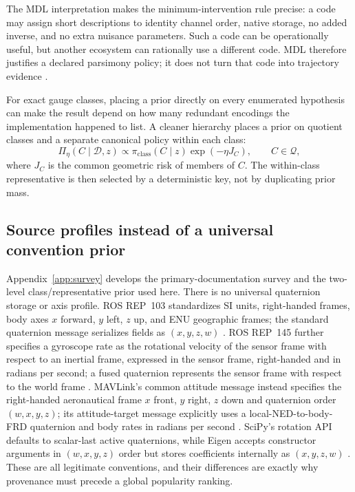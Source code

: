 \documentclass[11pt]{article}
\begin{document}
    The MDL interpretation makes the minimum-intervention rule precise: a code may assign
    short descriptions to identity channel order, native storage, no added inverse, and no
    extra nuisance parameters. Such a code can be operationally useful, but another
    ecosystem can rationally use a different code. MDL therefore justifies a declared
    parsimony policy; it does not turn that code into trajectory evidence
    \cite{rissanen1978}.

    For exact gauge classes, placing a prior directly on every enumerated hypothesis can
    make the result depend on how many redundant encodings the implementation happened to
    list. A cleaner hierarchy places a prior on quotient classes and a separate canonical
    policy within each class:
    \begin{equation}
        \Pi_\eta(C\mid\mathcal D,z)
        \propto
        \pi_{\mathrm{class}}(C\mid z)\exp(-\eta J_C),
        \qquad C\in\mathcal Q,
        \label{eq:class-posterior}
    \end{equation}
    where $J_C$ is the common geometric risk of members of $C$. The within-class
    representative is then selected by a deterministic key, not by duplicating prior mass.

    \subsection{Source profiles instead of a universal convention prior}

    Appendix~\ref{app:survey} develops the primary-documentation survey and the two-level class/representative prior used here. There is no universal quaternion storage or axis profile. ROS REP~103 standardizes SI
    units, right-handed frames, body axes $x$ forward, $y$ left, $z$ up, and ENU geographic
    frames; the standard quaternion message serializes fields as $(x,y,z,w)$
    \cite{rosrep103,rosQuaternion}. ROS REP~145 further specifies a gyroscope rate as the
    rotational velocity of the sensor frame with respect to an inertial frame, expressed in
    the sensor frame, right-handed and in radians per second; a fused quaternion represents
    the sensor frame with respect to the world frame \cite{rosrep145}. MAVLink's common
    attitude message instead specifies the right-handed aeronautical frame $x$ front, $y$
    right, $z$ down and quaternion order $(w,x,y,z)$; its attitude-target message explicitly
    uses a local-NED-to-body-FRD quaternion and body rates in radians per second
    \cite{mavlinkCommon}. SciPy's rotation API defaults to scalar-last active quaternions,
    while Eigen accepts constructor arguments in $(w,x,y,z)$ order but stores coefficients
    internally as $(x,y,z,w)$ \cite{scipyQuaternion,eigenQuaternion}. These are all
    legitimate conventions, and their differences are exactly why provenance must precede a
    global popularity ranking.
\end{document}
